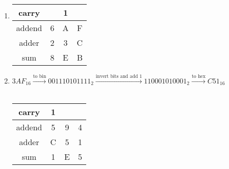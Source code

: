 \documentclass[a4paper]{article}
\begin{document}
{\begin{enumerate}[label=(\alph*)]
\begin{tabular}{ccccc}
            \end{tabular}
            \item
            \begin{tabular}{|c|c|c|c|}
                \hline
                carry&&1&  \\ \hline
                addend&6&A&F  \\ \hline
                adder&2&3&C  \\ \hline
                sum&8&E&B  \\ \hline
            \end{tabular}
            \item $3AF_{16}\xrightarrow{\text{to bin}}001110101111_2\xrightarrow{\text{invert bits and add 1}}110001010001_2\xrightarrow{\text{to hex}}C51_{16}$ \\ \\
            \begin{tabular}{|c|c|c|c|}
                \hline
                carry&1&&  \\ \hline
                addend&5&9&4  \\ \hline
                adder&C&5&1  \\ \hline
                sum&1&E&5  \\ \hline
            \end{tabular}
        \end{enumerate}
    }
    
\end{document}
